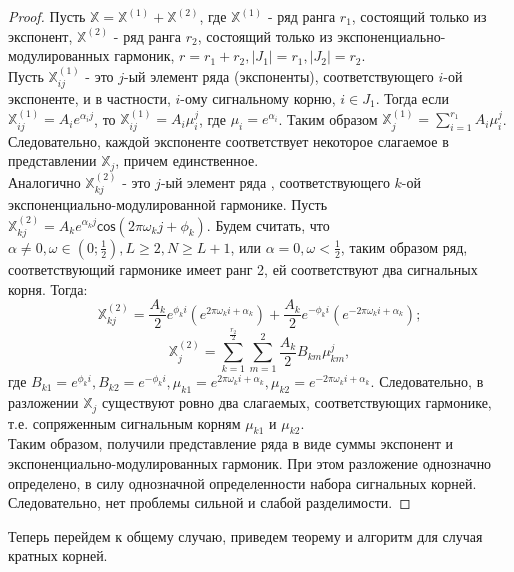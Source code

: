 \documentclass[specialist, substylefile = spbureport.rtx, subf,href,colorlinks=true, 12pt]{disser}
\theoremstyle{definition}
\begin{document}
\begin{proof}
Пусть $\mathbb{X} = \mathbb{X}^{(1)} + \mathbb{X}^{(2)}$, где $\mathbb{X}^{(1)}$ - ряд ранга $r_1$, состоящий только из экспонент, $\mathbb{X}^{(2)}$ - ряд ранга $r_2$, состоящий только из экспоненциально-модулированных гармоник, $r = r_1 + r_2, |J_1| = r_1, |J_2| = r_2$. \\
\hspace*{0.5cm}Пусть $\mathbb{X}^{(1)}_{ij}$ - это $j$-ый элемент ряда (экспоненты), соответствующего $i$-ой экспоненте, и в частности, $i$-ому сигнальному корню, $i \in J_1$. Тогда если $\mathbb{X}^{(1)}_{ij} = A_i e^{\alpha_i j}$, то $\mathbb{X}^{(1)}_{ij} = A_i\mu_i^j$, где $\mu_i = e^{\alpha_i}$. Таким образом $\mathbb{X}^{(1)}_j = \sum_{i = 1}^{r_1}A_i\mu_i^j$. Следовательно, каждой экспоненте соответствует некоторое слагаемое в представлении $\mathbb{X}_j$, причем единственное. \\
\hspace*{0.5cm} Аналогично $\mathbb{X}^{(2)}_{kj}$ - это $j$-ый элемент ряда , соответствующего $k$-ой экспоненциально-модулированной гармонике. Пусть $\mathbb{X}^{(2)}_{kj} = A_k e^{\alpha_k j}\mathsf{cos}(2\pi \omega_k j + \phi_k)$. Будем считать, что $\alpha \neq 0,\omega \in (0;\frac{1}{2}), L \geq 2, N \geq L + 1$, или $\alpha = 0, \omega < \frac{1}{2}$, таким образом ряд, соответствующий гармонике имеет ранг 2, ей соответствуют два сигнальных корня. Тогда:
\begin{equation*}
    \mathbb{X}^{(2)}_{kj} = \frac{A_k}{2}e^{\phi_k i}(e^{2\pi \omega_k i + \alpha_k}) + \frac{A_k}{2}e^{-\phi_k i}(e^{-2\pi \omega_k i + \alpha_k});
\end{equation*}
\begin{equation*}
    \mathbb{X}^{(2)}_{j} = \sum_{k = 1}^{\frac{r_2}{2}}\sum_{m = 1}^{2}\frac{A_k}{2}B_{km}\mu_{km}^{j},
\end{equation*}
где $B_{k1} = e^{\phi_k i}, B_{k2} = e^{-\phi_k i}, \mu_{k1} = e^{2\pi \omega_k i + \alpha_k}, \mu_{k2} = e^{-2\pi \omega_k i + \alpha_k}$. Следовательно, в разложении $\mathbb{X}_j$ существуют ровно два слагаемых, соответствующих гармонике, т.е. сопряженным сигнальным корням $\mu_{k1}$ и $\mu_{k2}$. \\
Таким образом, получили представление ряда в виде суммы экспонент и экспоненциально-модулированных гармоник. При этом разложение однозначно определено, в силу однозначной определенности набора сигнальных корней. Следовательно, нет проблемы сильной и слабой разделимости.
\end{proof}

Теперь перейдем к общему случаю, приведем теорему и алгоритм для случая кратных корней.
\end{document}
